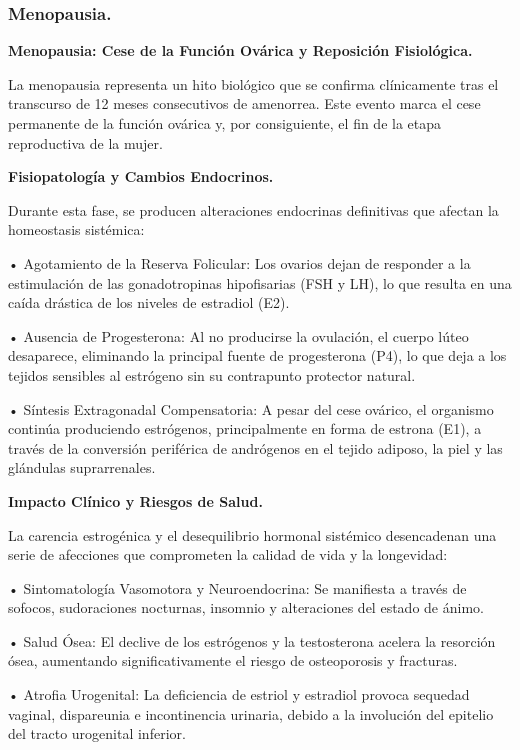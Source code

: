 \documentclass[
  spanish,
]{article}
\begin{document}
\subsubsection{Menopausia.}\label{menopausia.}

\textbf{Menopausia: Cese de la Función Ovárica y Reposición Fisiológica.}

La menopausia representa un hito biológico que se confirma clínicamente tras el transcurso de 12 meses consecutivos de amenorrea. Este evento marca el cese permanente de la función ovárica y, por consiguiente, el fin de la etapa reproductiva de la mujer.

\textbf{Fisiopatología y Cambios Endocrinos.}

Durante esta fase, se producen alteraciones endocrinas definitivas que afectan la homeostasis sistémica:

• Agotamiento de la Reserva Folicular: Los ovarios dejan de responder a la estimulación de las gonadotropinas hipofisarias (FSH y LH), lo que resulta en una caída drástica de los niveles de estradiol (E2).

• Ausencia de Progesterona: Al no producirse la ovulación, el cuerpo lúteo desaparece, eliminando la principal fuente de progesterona (P4), lo que deja a los tejidos sensibles al estrógeno sin su contrapunto protector natural.

• Síntesis Extragonadal Compensatoria: A pesar del cese ovárico, el organismo continúa produciendo estrógenos, principalmente en forma de estrona (E1), a través de la conversión periférica de andrógenos en el tejido adiposo, la piel y las glándulas suprarrenales.

\textbf{Impacto Clínico y Riesgos de Salud.}

La carencia estrogénica y el desequilibrio hormonal sistémico desencadenan una serie de afecciones que comprometen la calidad de vida y la longevidad:

• Sintomatología Vasomotora y Neuroendocrina: Se manifiesta a través de sofocos, sudoraciones nocturnas, insomnio y alteraciones del estado de ánimo.

• Salud Ósea: El declive de los estrógenos y la testosterona acelera la resorción ósea, aumentando significativamente el riesgo de osteoporosis y fracturas.

• Atrofia Urogenital: La deficiencia de estriol y estradiol provoca sequedad vaginal, dispareunia e incontinencia urinaria, debido a la involución del epitelio del tracto urogenital inferior.
\end{document}
